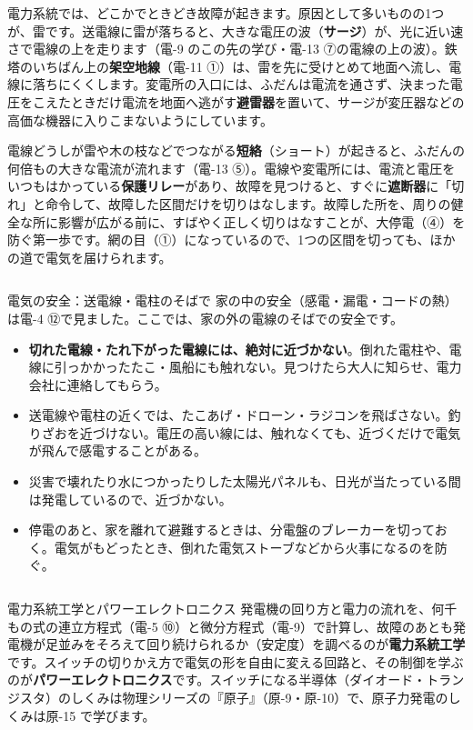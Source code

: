 \leavevmode\label{ph:電-16:sec9}電力系統では、どこかでときどき故障が起きます。原因として多いものの1つが、雷です。送電線に雷が落ちると、大きな電圧の波（\textbf{サージ}）が、光に近い速さで電線の上を走ります（電-9 のこの先の学び・電-13 ⑦の電線の上の波）。鉄塔のいちばん上の\textbf{架空地線}（電-11 ①）は、雷を先に受けとめて地面へ流し、電線に落ちにくくします。変電所の入口には、ふだんは電流を通さず、決まった電圧をこえたときだけ電流を地面へ逃がす\textbf{避雷器}を置いて、サージが変圧器などの高価な機器に入りこまないようにしています。

電線どうしが雷や木の枝などでつながる\textbf{短絡}（ショート）が起きると、ふだんの何倍もの大きな電流が流れます（電-13 ⑤）。電線や変電所には、電流と電圧をいつもはかっている\textbf{保護リレー}があり、故障を見つけると、すぐに\textbf{遮断器}に「切れ」と命令して、故障した区間だけを切りはなします。故障した所を、周りの健全な所に影響が広がる前に、すばやく正しく切りはなすことが、大停電（④）を防ぐ第一歩です。網の目（①）になっているので、1つの区間を切っても、ほかの道で電気を届けられます。

\begin{column}{電気の安全：送電線・電柱のそばで}
家の中の安全（感電・漏電・コードの熱）は電-4 ⑫で見ました。ここでは、家の外の電線のそばでの安全です。
\begin{itemize}[leftmargin=1.2\zw, itemsep=1pt, topsep=2pt, label={\color{bkTheme}●}]
\item \textbf{切れた電線・たれ下がった電線には、絶対に近づかない}。倒れた電柱や、電線に引っかかったたこ・風船にも触れない。見つけたら大人に知らせ、電力会社に連絡してもらう。
\item 送電線や電柱の近くでは、たこあげ・ドローン・ラジコンを飛ばさない。釣りざおを近づけない。電圧の高い線には、触れなくても、近づくだけで電気が飛んで感電することがある。
\item 災害で壊れたり水につかったりした太陽光パネルも、日光が当たっている間は発電しているので、近づかない。
\item 停電のあと、家を離れて避難するときは、分電盤のブレーカーを切っておく。電気がもどったとき、倒れた電気ストーブなどから火事になるのを防ぐ。
\end{itemize}
\end{column}

\begin{phsaki}{電力系統工学とパワーエレクトロニクス}
発電機の回り方と電力の流れを、何千もの式の連立方程式（電-5 ⑩）と微分方程式（電-9）で計算し、故障のあとも発電機が足並みをそろえて回り続けられるか（安定度）を調べるのが\textbf{電力系統工学}です。スイッチの切りかえ方で電気の形を自由に変える回路と、その制御を学ぶのが\textbf{パワーエレクトロニクス}です。スイッチになる半導体（ダイオード・トランジスタ）のしくみは物理シリーズの『原子』（原-9・原-10）で、原子力発電のしくみは原-15 で学びます。
\end{phsaki}


